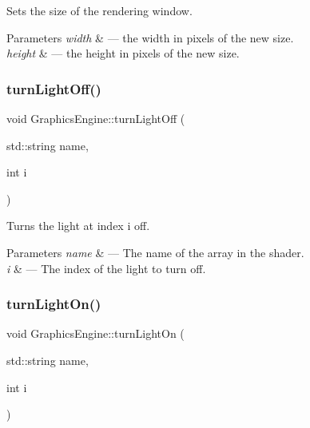Sets the size of the rendering window. 


\begin{DoxyParams}{Parameters}
{\em width} & --- the width in pixels of the new size.\\
\hline
{\em height} & --- the height in pixels of the new size. \\
\hline
\end{DoxyParams}
\mbox{\label{class_graphics_engine_adb11cc7d06a8fa721d2037791297f102}} 
\subsubsection{\texorpdfstring{turn\+Light\+Off()}{turnLightOff()}}
{\footnotesize\ttfamily void Graphics\+Engine\+::turn\+Light\+Off (\begin{DoxyParamCaption}\item[{std\+::string}]{name,  }\item[{int}]{i }\end{DoxyParamCaption})}



Turns the light at index i off. 


\begin{DoxyParams}{Parameters}
{\em name} & --- The name of the array in the shader.\\
\hline
{\em i} & --- The index of the light to turn off. \\
\hline
\end{DoxyParams}
\mbox{\label{class_graphics_engine_a72154214616a1799e1670451586c3983}} 
\subsubsection{\texorpdfstring{turn\+Light\+On()}{turnLightOn()}}
{\footnotesize\ttfamily void Graphics\+Engine\+::turn\+Light\+On (\begin{DoxyParamCaption}\item[{std\+::string}]{name,  }\item[{int}]{i }\end{DoxyParamCaption})}



